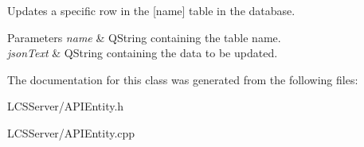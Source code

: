 Updates a specific row in the \mbox{[}name\mbox{]} table in the database. 
\begin{DoxyParams}{Parameters}
{\em name} & Q\+String containing the table name. \\
\hline
{\em json\+Text} & Q\+String containing the data to be updated. \\
\hline
\end{DoxyParams}


The documentation for this class was generated from the following files\+:\begin{DoxyCompactItemize}
\item 
L\+C\+S\+Server/A\+P\+I\+Entity.\+h\item 
L\+C\+S\+Server/A\+P\+I\+Entity.\+cpp\end{DoxyCompactItemize}
